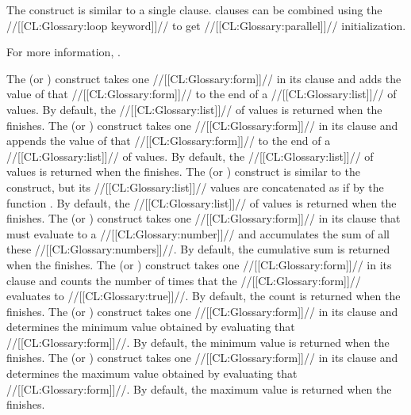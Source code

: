 The  construct is similar to a single  clause.  clauses can be combined using the //[[CL:Glossary:loop keyword]]//  to get //[[CL:Glossary:parallel]]// initialization.

For more information, \seesection\LOOPVarInitAndStep.

\endsubsubsubsection%

  The  (or ) construct takes one //[[CL:Glossary:form]]// in its clause and adds the value of that //[[CL:Glossary:form]]// to the end of a //[[CL:Glossary:list]]//  of values.  By default, the //[[CL:Glossary:list]]// of values is returned  when the  finishes.
  The  (or ) construct  takes one //[[CL:Glossary:form]]// in its clause and appends the value of that //[[CL:Glossary:form]]// to the end of a //[[CL:Glossary:list]]// of values.  By default, the //[[CL:Glossary:list]]// of values is returned when the   finishes.
  The  (or ) construct  is similar to the  construct,   but its //[[CL:Glossary:list]]// values are concatenated as if by the function .  By default, the //[[CL:Glossary:list]]// of values is returned when  the  finishes.
  The  (or ) construct  takes one //[[CL:Glossary:form]]// in its clause  that must evaluate to a //[[CL:Glossary:number]]// and accumulates the sum of all these //[[CL:Glossary:numbers]]//.  By default, the cumulative sum is returned when the  finishes.
  The  (or ) construct  takes one //[[CL:Glossary:form]]// in its clause  and counts the number of times that the //[[CL:Glossary:form]]// evaluates to //[[CL:Glossary:true]]//. By default, the count is returned when the  finishes.
  The  (or ) construct takes one //[[CL:Glossary:form]]// in its clause  and determines the minimum value obtained by evaluating that //[[CL:Glossary:form]]//. By default, the minimum value is returned when the  finishes.
  The  (or ) construct takes one //[[CL:Glossary:form]]// in its clause  and determines the maximum value obtained by evaluating that //[[CL:Glossary:form]]//. By default, the maximum value is returned when the  finishes.

